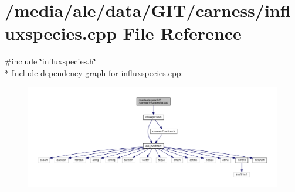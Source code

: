 \hypertarget{a00033}{\section{/media/ale/data/\-G\-I\-T/carness/influxspecies.cpp File Reference}
\label{a00033}
}
{\ttfamily \#include \char`\"{}influxspecies.\-h\char`\"{}}\\*
Include dependency graph for influxspecies.\-cpp\-:\nopagebreak
\begin{figure}[H]
\begin{center}
\leavevmode
\includegraphics[width=350pt]{a00064}
\end{center}
\end{figure}
